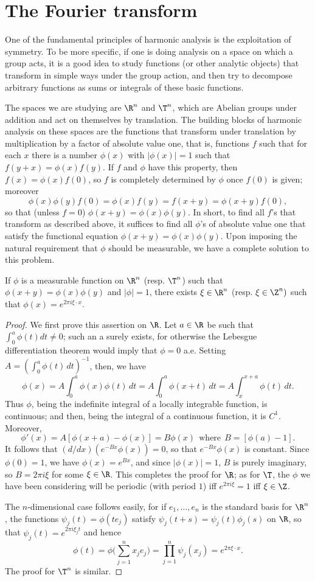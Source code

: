 \section{The Fourier transform}
One of the fundamental principles of harmonic analysis is the exploitation of symmetry. To be more specific, if one is doing analysis on a space on which a group acts, it is a good idea to study functions (or other analytic objects) that transform in simple ways under the group action, and then try to decompose arbitrary functions as sums or integrals of these basic functions.\par
The spaces we are studying are $\R^n$ and $\T^n$, which are Abelian groups under addition and act on themselves by translation. The building blocks of harmonic analysis on these spaces are the functions that transform under translation by multiplication by a factor of absolute value one, that is, functions $f$ such that for each $x$ there is a number $\phi(x)$ with $|\phi(x)|=1$ such that $f(y+x)=\phi(x)f(y)$. If $f$ and $\phi$ have this property, then $f(x)=\phi(x)f(0)$, so $f$ is completely determined by $\phi$ once $f(0)$ is given; moreover
\[\phi(x)\phi(y)f(0)=\phi(x)f(y)=f(x+y)=\phi(x+y)f(0),\]
so that (unless $f=0$) $\phi(x+y)=\phi(x)\phi(y)$. In short, to find all $f$'s that transform as described above, it suffices to find all $\phi$'s of absolute value one that satisfy the functional equation $\phi(x+y)=\phi(x)\phi(y)$. Upon imposing the natural requirement that $\phi$ should be measurable, we have a complete solution to this problem.
\begin{theorem}
If $\phi$ is a measurable function on $\R^n$ (resp. $\T^n$) such that $\phi(x+y)=\phi(x)\phi(y)$ and $|\phi|=1$, there exists $\xi\in\R^n$ (resp. $\xi\in\Z^n)$ such that $\phi(x)=e^{2\pi i\xi\cdot x}$.
\end{theorem}
\begin{proof}
We first prove this assertion on $\R$. Let $a\in\R$ be such that $\int_0^a\phi(t)dt\neq 0$; such an a surely exists, for otherwise the Lebesgue differentiation theorem would imply that $\phi=0$ a.e. Setting $A=(\int_{0}^{a}\phi(t)\,dt)^{-1}$, then, we have
\[\phi(x)=A\int_0^{a}\phi(x)\phi(t)\,dt=A\int_{0}^{a}\phi(x+t)\,dt=A\int_{x}^{x+a}\phi(t)\,dt.\]
Thus $\phi$, being the indefinite integral of a locally integrable function, is continuous; and then, being the integral of a continuous function, it is $C^1$. Moreover,
\[\phi'(x)=A[\phi(x+a)-\phi(x)]=B\phi(x)\ \ \text{where}\ \ B=[\phi(a)-1].\]
It follows that $(d/dx)(e^{-Bx}\phi(x))=0$, so that $e^{-Bx}\phi(x)$ is constant. Since $\phi(0)=1$, we have $\phi(x)=e^{Bx}$, and since $|\phi(x)|=1$, $B$ is purely imaginary, so $B=2\pi i\xi$ for some $\xi\in\R$. This completes the proof for $\R$; as for $\T$, the $\phi$ we have been considering will be periodic (with period $1$) iff $e^{2\pi i\xi}=1$ iff $\xi\in\Z$.\par
The $n$-dimensional case follows easily, for if $e_1,\dots,e_n$ is the standard basis for $\R^n$, the functions $\psi_j(t)=\phi(te_j)$ satisfy $\psi_j(t+s)=\psi_j(t)\phi_j(s)$ on $\R$, so that $\psi_j(t)=e^{2\pi i\xi_jt}$ and hence
\[\phi(t)=\phi\Big(\sum_{j=1}^{n}x_je_j\Big)=\prod_{j=1}^{n}\psi_j(x_j)=e^{2\pi\xi\cdot x}.\]
The proof for $\T^n$ is similar.
\end{proof}
